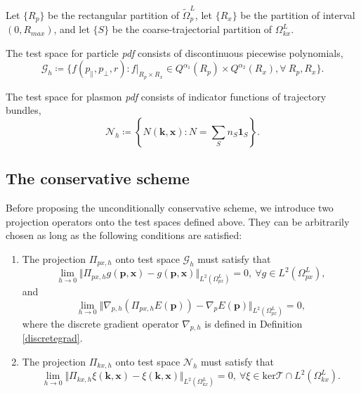 \documentclass{article}
\numberwithin{equation}{section}
\begin{document}
Let $\{R_{p}\}$ be the rectangular partition of $\tilde{\Omega}^{L}_{p}$, let $\{R_{x}\}$ be the partition of interval $(0,R_{max})$, and let  $\{S\}$ be the coarse-trajectorial partition of $\Omega_{kx}^{L}$.

The test space for particle \textit{pdf} consists of discontinuous piecewise polynomials,
\begin{equation}\label{testspace_f}
    \mathcal{G}_{h}\coloneqq\{f(p_{\parallel},p_{\perp},r):f|_{R_{p}\times R_{x}}\in Q^{\alpha_{1}}(R_{p})\times Q^{\alpha_{2}}(R_{x}),\forall~R_{p},R_{x}\}.
\end{equation}

The test space for plasmon \textit{pdf} consists of indicator functions of trajectory bundles,
\begin{equation}\label{testspace_N}
    \mathcal{N}_{h}\coloneqq\left\{ N(\mathbf{k},\mathbf{x}):N=\sum_{S}n_{S}\mathbf{1}_{S}\right\}.
\end{equation}




\subsection{The conservative scheme}
Before proposing the unconditionally conservative scheme, we introduce two projection operators onto the test spaces defined above. They can be arbitrarily chosen as long as the following conditions are satisfied:

\begin{enumerate}
    \item The projection $\Pi_{px,h}$ onto test space $\mathcal{G}_{h}$ must satisfy that 
    \begin{equation*}
        \ensuremath{\lim_{h\rightarrow0}\Vert\Pi_{px,h}g(\mathbf{p},\mathbf{x})-g(\mathbf{p},\mathbf{x})\Vert_{L^{2}(\Omega_{px}^{L})}=0},\ \forall g\in L^{2}(\Omega_{px}^{L}),
    \end{equation*}
    and
    \begin{equation*}
        \ensuremath{\lim_{h\rightarrow0}\Vert\nabla_{p,h}\left(\Pi_{px,h}E(\mathbf{p})\right)-\nabla_{p}E(\mathbf{p})\Vert_{L^{2}(\Omega_{px}^{L})}=0},
    \end{equation*}
    where the discrete gradient operator $\nabla_{p,h}$ is defined in Definition \ref{discretegrad}.

    \item The projection $\Pi_{kx,h}$ onto test space $\mathcal{N}_{h}$ must satisfy that 
    \begin{equation*}
        \ensuremath{\lim_{h\rightarrow0}\Vert\Pi_{kx,h}\xi(\mathbf{k}, \mathbf{x})-\xi(\mathbf{k}, \mathbf{x})\Vert_{L^{2}(\Omega_{kx}^{L})}=0},\ \forall\xi\in\text{ker}\mathcal{T}\cap L^{2}(\Omega_{kx}^{L}).
    \end{equation*}

\end{enumerate}
\end{document}
